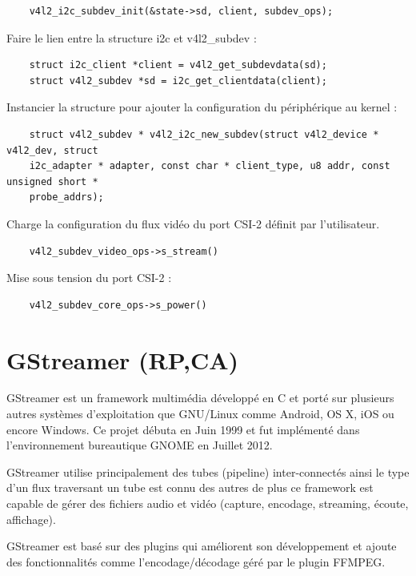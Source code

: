 \begin{lstlisting}
    v4l2_i2c_subdev_init(&state->sd, client, subdev_ops);
\end{lstlisting}

Faire le lien entre la structure i2c et v4l2\_subdev :

\begin{lstlisting}
    struct i2c_client *client = v4l2_get_subdevdata(sd);
    struct v4l2_subdev *sd = i2c_get_clientdata(client);
\end{lstlisting}

Instancier la structure pour ajouter la configuration du périphérique au kernel :

\begin{lstlisting}
    struct v4l2_subdev * v4l2_i2c_new_subdev(struct v4l2_device * v4l2_dev, struct
    i2c_adapter * adapter, const char * client_type, u8 addr, const unsigned short *
    probe_addrs);
\end{lstlisting}

Charge la configuration du flux vidéo du port CSI-2 définit par l’utilisateur.

\begin{lstlisting}
    v4l2_subdev_video_ops->s_stream()
\end{lstlisting}

Mise sous tension du port CSI-2 :

\begin{lstlisting}
    v4l2_subdev_core_ops->s_power()
\end{lstlisting}

\section{GStreamer (RP,CA)}

GStreamer est un framework multimédia développé en C et porté sur plusieurs autres
systèmes d’exploitation que GNU/Linux comme Android, OS X, iOS ou encore Windows.
Ce projet débuta en Juin 1999 et fut implémenté dans l’environnement bureautique
GNOME en Juillet 2012. \medskip

GStreamer utilise principalement des tubes (pipeline) inter-connectés ainsi le type d’un
flux traversant un tube est connu des autres de plus ce framework est capable de gérer
des fichiers audio et vidéo (capture, encodage, streaming, écoute, affichage).\medskip

GStreamer est basé sur des plugins qui améliorent son développement et ajoute des
fonctionnalités comme l’encodage/décodage géré par le plugin FFMPEG.\medskip

